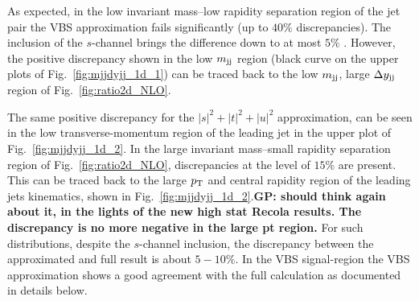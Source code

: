 As expected, in the low invariant mass--low rapidity separation region of the jet pair the VBS approximation fails significantly (up to $40\%$ discrepancies).
The inclusion of the $s$-channel brings the difference down to at most $5\%$ .
However, the positive discrepancy shown in the low $m_{\text{j}\text{j}}$ region (black curve on the upper plots of Fig.~\ref{fig:mjjdyjj_1d_1}) can be traced back to the low $m_{\text{j}\text{j}}$, large $\Delta y_{\text{j}\text{j}}$ region of Fig.~\ref{fig:ratio2d_NLO}.
% 

The same positive discrepancy for the $|s|^2 + |t|^2 + |u|^2$ approximation, can be seen in the low transverse-momentum region of the leading jet in the upper plot of Fig.~\ref{fig:mjjdyjj_1d_2}.
In the large invariant mass--small rapidity separation region of Fig.~\ref{fig:ratio2d_NLO}, discrepancies at the level of $15\%$ are present. This can be traced back to the large $p_\text{T}$ and central rapidity region of the leading jets kinematics, shown in Fig.~\ref{fig:mjjdyjj_1d_2}.{\bf GP: should think again about it, in the lights of the new high stat Recola results. The discrepancy is no more negative in the large pt region.}
For such distributions, despite the $s$-channel inclusion, the discrepancy between the approximated and full result is about $5-10\%$.
In the VBS signal-region the VBS approximation shows a good agreement with the full calculation as documented in details below.

